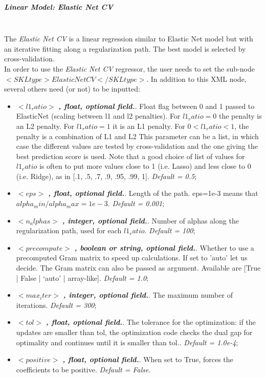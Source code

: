 \subparagraph{Linear Model: Elastic Net CV}
\mbox{}
\\The \textit{Elastic Net CV} is a linear regression similar to Elastic Net model but with an iterative fitting along a regularization path. The best model is selected by cross-validation.
\\In order to use the  \textit{Elastic Net CV} regressor, the user needs to set the sub-node $<SKLtype>ElasticNetCV</SKLtype>$. In addition to this XML node, several others need (or not) to be inputted:
\begin{itemize}
\item $<l1_ratio>$ \textbf{\textit{, float, optional field.}}. Float flag between 0 and 1 passed to ElasticNet (scaling between l1 and l2 penalties). For $l1_ratio = 0$ the penalty is an L2 penalty. For $l1_ratio = 1$ it is an L1 penalty. For $0 < l1_ratio < 1$, the penalty is a combination of L1 and L2 This parameter can be a list, in which case the different values are tested by cross-validation and the one giving the best prediction score is used. Note that a good choice of list of values for $l1_ratio$ is often to put more values close to 1 (i.e. Lasso) and less close to 0 (i.e. Ridge), as in [.1, .5, .7, .9, .95, .99, 1]. \textit{Default = 0.5};
\item $<eps>$ \textbf{\textit{, float, optional field.}}.  Length of the path. eps=1e-3 means that $alpha_min / alpha_max = 1e-3$. \textit{Default = 0.001};
\item $<n_alphas>$ \textbf{\textit{, integer, optional field.}}.  Number of alphas along the regularization path, used for each $l1_ratio$. \textit{Default = 100};
\item $<precompute>$ \textbf{\textit{, boolean or string, optional field.}}.  Whether to use a precomputed Gram matrix to speed up calculations. If set to 'auto' let us decide. The Gram matrix can also be passed as argument. Available are [True | False | ‘auto’ | array-like]. \textit{Default = 1.0};
\item $<max_iter>$ \textbf{\textit{, integer, optional field.}}.  The maximum number of iterations. \textit{Default = 300};
\item $<tol>$ \textbf{\textit{, float, optional field.}}.  The tolerance for the optimization: if the updates are smaller than tol, the optimization code checks the dual gap for optimality and continues until it is smaller than tol.. \textit{Default = 1.0e-4};
\item $<positive>$ \textbf{\textit{, float, optional field.}}.  When set to True, forces the coefficients to be positive. \textit{Default =  False}.
\end{itemize}

